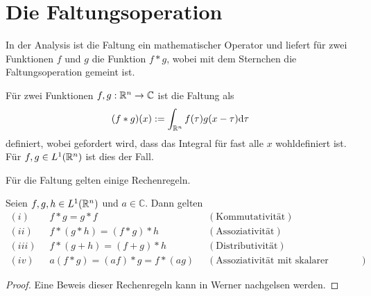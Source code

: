 
\section{Die Faltungsoperation}
\label{abs:conv_theorie}
In der Analysis ist die Faltung ein mathematischer Operator und liefert für zwei Funktionen $f$ und $g$ die Funktion $ f \ast g$, wobei mit dem Sternchen die Faltungsoperation gemeint ist.

\begin{defi}[Faltung]\label{allg_faltung}
    Für zwei Funktionen $f,g: \mathbb{R}^{n} \rightarrow \mathbb{C}$ ist die Faltung als
    \begin{equation*}
        (f \ast g) (x) := \int_{\mathbb{R}^{n}} f(\tau) g(x-\tau) \mathrm{d} \tau
    \end{equation*}
    definiert, wobei gefordert wird, dass das Integral für fast alle $x$ wohldefiniert ist. Für $f,g \in L^1(\mathbb{R}^n)$ ist dies der Fall.
   \end{defi}

Für die Faltung gelten einige Rechenregeln.

\begin{lem}
    \label{lem:convrules}
    Seien $f,g,h \in L^1(\mathbb{R}^n)$ und $a \in \mathbb{C}$. Dann gelten
    \begin{align*}
         (i) \; \; &f \ast g = g \ast f \; \; &( \text{Kommutativität}) \\
         (ii) \; \; &f \ast (g \ast h) = (f \ast g) \ast h  \; \;& (\text{Assoziativität}) \\
         (iii) \; \; &f \ast (g+h) = (f+g) \ast h \; \; &(\text{Distributivität}) \\ 
         (iv) \; \; &a(f \ast g) = (af) \ast g = f \ast (ag) \; \; &(\text{Assoziativität mit skalarer Multiplikation}) 
    \end{align*}
\end{lem}

\begin{proof}
    Eine Beweis dieser Rechenregeln kann in Werner\cite{werner2011funktionalanalysis} nachgelsen werden.
\end{proof}

